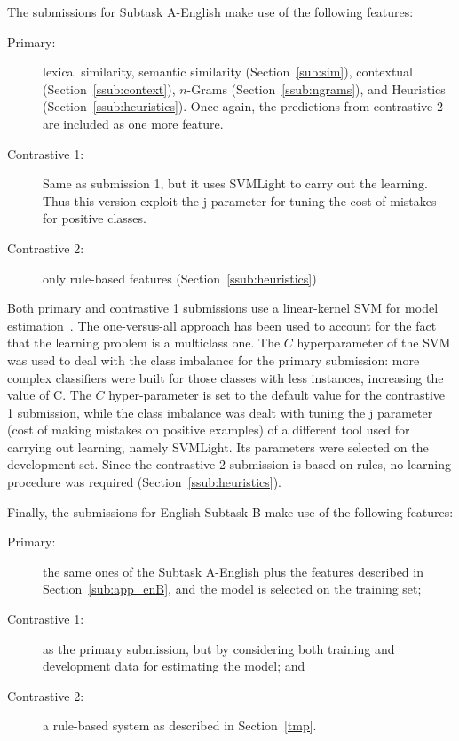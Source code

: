 The submissions for Subtask A-English make use of the following features: 
\begin{description}
\item[Primary:] 
  lexical similarity, semantic similarity (Section~\ref{sub:sim}), contextual 
  (Section~\ref{ssub:context}), $n$-Grams (Section~\ref{ssub:ngrams}), and
  Heuristics (Section~\ref{ssub:heuristics}). Once again, the predictions from 
  contrastive 2 are included as one more feature. 
\item[Contrastive 1:] 
  Same as submission 1, but it uses SVMLight to carry out the learning. Thus 
  this version exploit the j parameter for tuning the cost of mistakes for 
  positive classes.
    
\item[Contrastive 2:] 
  only rule-based features 
(Section~\ref{ssub:heuristics}) 
\end{description}
% 
Both primary and contrastive 1 submissions use a linear-kernel SVM for model 
estimation~\cite{}. The one-versus-all approach has been used to account for the fact 
that the learning problem is a multiclass one. The $C$ hyperparameter of the SVM 
was used to deal with the class imbalance for the primary submission: more complex classifiers were built for those classes with less instances, increasing the value of C. The $C$ hyper-parameter is set to the default value for the contrastive 1 submission, while the class imbalance was dealt with tuning the j parameter (cost of making mistakes on positive examples) of a different tool used for carrying out learning, namely SVMLight. Its parameters 
were selected on the development set. Since the contrastive 2 submission is based on rules, no learning procedure was required (Section~\ref{ssub:heuristics}).

Finally, the submissions for English Subtask B make use of the following 
features:
\begin{description}
 \item[Primary:] the same ones of the Subtask A-English plus the features 
described in Section~\ref{sub:app_enB}, and the model is selected on the 
training set; 
 \item[Contrastive 1:] as the primary submission, but by considering both 
training and development data for estimating the model; and
 \item[Contrastive 2:] a rule-based system as described in 
Section~\ref{tmp}.
 \end{description}

